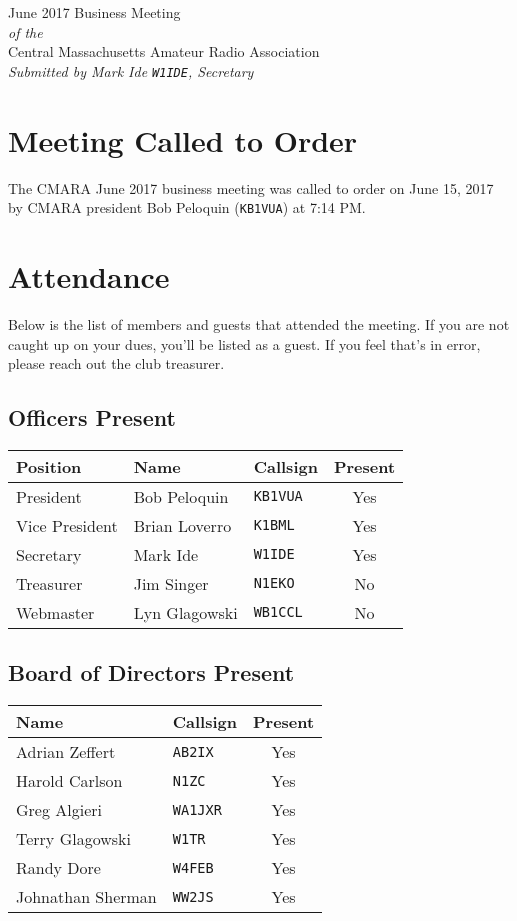 \documentclass[10pt,letterpaper]{article}
\begin{document}
\begin{center}
{\huge June 2017 Business Meeting}\\
\emph{of the}\\
{\Large Central Massachusetts Amateur Radio Association}\\
\emph{Submitted by Mark Ide \texttt{W1IDE}, Secretary}
\end{center}

\section{Meeting Called to Order}
The CMARA June 2017 business meeting was called to order on June 15, 2017 by CMARA president Bob Peloquin (\texttt{KB1VUA}) at 7:14 PM.

\section{Attendance}
\noindent
Below is the list of members and guests that attended the meeting. If you are not caught up on your dues, you'll be listed as a guest. If you feel that's in error, please reach out the club treasurer.

\subsection{Officers Present}
\begin{tabular}{|l|l|l|c|}
  \hline
  \textbf{Position} & \textbf{Name}  & \textbf{Callsign} & \textbf{Present} \\ \hline
  President         & Bob Peloquin   & \texttt{KB1VUA}   & Yes \\
  Vice President    & Brian Loverro  & \texttt{K1BML}    & Yes \\
  Secretary         & Mark Ide       & \texttt{W1IDE}    & Yes \\
  Treasurer         & Jim Singer     & \texttt{N1EKO}    & No \\
  Webmaster         & Lyn Glagowski  & \texttt{WB1CCL}   & No \\
  \hline
\end{tabular}

\subsection{Board of Directors Present}
\begin{tabular}{|l|l|c|}
  \hline
  \textbf{Name}     & \textbf{Callsign} & \textbf{Present} \\ \hline
  Adrian Zeffert    & \texttt{AB2IX}    & Yes \\
  Harold Carlson    & \texttt{N1ZC}     & Yes \\
  Greg Algieri      & \texttt{WA1JXR}   & Yes \\
  Terry Glagowski   & \texttt{W1TR}     & Yes \\
  Randy Dore        & \texttt{W4FEB}    & Yes \\
  Johnathan Sherman & \texttt{WW2JS}    & Yes \\
  \hline
\end{tabular}
\end{document}
